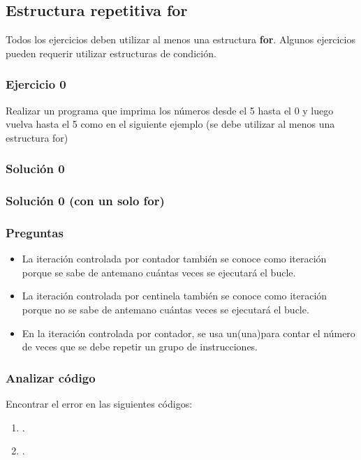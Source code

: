 \subsection*{Estructura repetitiva for}
Todos los ejercicios deben utilizar al menos una estructura \textbf{for}.
Algunos ejercicios pueden requerir utilizar estructuras de condición.

\subsubsection{Ejercicio 0} 
Realizar un programa que imprima los números desde el 5 hasta el 0 y luego vuelva hasta el 5 como en el siguiente ejemplo (se debe utilizar al menos una estructura for)

\subsubsection{Solución 0} 

\lstset{inputencoding=utf8/latin1}

{\small
  \lstset{inputencoding=utf8/latin1}
  
}
\subsubsection{Solución 0 (con un solo for)} 

{\small
  \lstset{inputencoding=utf8/latin1}
  
}

\subsubsection{Preguntas}
\begin{itemize}
  \item La iteración controlada por contador también se conoce como iteración \underspace porque se sabe de antemano cuántas veces se ejecutará el bucle.
  \item La iteración controlada por centinela también se conoce como iteración \underspace porque no se sabe de antemano cuántas veces se ejecutará el bucle.
  \item En la iteración controlada por contador, se usa un(una)\underspace  para contar el número de veces que se debe repetir un grupo de instrucciones.
\end{itemize}

\subsubsection{Analizar código}
Encontrar el error en las siguientes códigos:
\begin{enumerate}
  \item .
  
  \item .
  
\end{enumerate}

